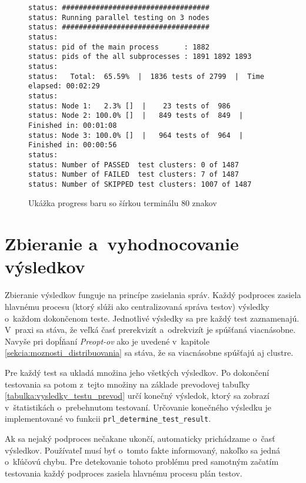 \begin{figure}[h]
\begin{lstlisting}
status: ###################################
status: Running parallel testing on 3 nodes
status: ###################################
status: 
status: pid of the main process      : 1882
status: pids of the all subprocesses : 1891 1892 1893
status: 
status:   Total:  65.59%  |  1836 tests of 2799  |  Time elapsed: 00:02:29      
status:                                                                         
status: Node 1:   2.3% []  |    23 tests of  986                                
status: Node 2: 100.0% []  |   849 tests of  849  |  Finished in: 00:01:08      
status: Node 3: 100.0% []  |   964 tests of  964  |  Finished in: 00:00:56      
status:                                                                         
status: Number of PASSED  test clusters: 0 of 1487                              
status: Number of FAILED  test clusters: 7 of 1487                              
status: Number of SKIPPED test clusters: 1007 of 1487
\end{lstlisting}
\caption{Ukážka progress baru so šírkou terminálu 80 znakov}
\label{obrazok:progress_bar}
\end{figure}


\section{Zbieranie a~vyhodnocovanie výsledkov}
\label{sekcia:zbieranie_vysledkov}
Zbieranie výsledkov funguje na princípe zasielania správ. 
Každý podproces zasiela hlavnému procesu (ktorý slúži ako centralizovaná
správa testov) výsledky o~každom dokončenom teste. Jednotlivé výsledky sa
pre každý test zaznamenajú. V~praxi sa stáva, že veľká časť prerekvizít
a~odrekvizít je spúšťaná viacnásobne. Navyše pri dopĺňaní \textit{Preopt-ov}
ako je uvedené v~kapitole \ref{sekcia:moznosti_distribuovania} sa stáva, 
že sa viacnásobne spúšťajú aj clustre. 

Pre každý test sa ukladá množina jeho všetkých výsledkov. 
Po dokončení testovania sa potom z~tejto množiny na základe prevodovej
tabuľky \ref{tabulka:vysledky_testu_prevod} určí konečný výsledok,
ktorý sa zobrazí v~štatistikách o~prebehnutom testovaní.
Určovanie konečného výsledku je implementované vo funkcii \texttt{prl\_determine\_test\_result}.

Ak sa nejaký podproces nečakane ukončí, automaticky prichádzame o~časť výsledkov.
Používateľ musí byť o~tomto fakte informovaný, nakoľko sa jedná o~kľúčovú chybu.
Pre detekovanie tohoto problému pred samotným začatím testovania každý podproces
zasiela hlavnému procesu plán testov.

